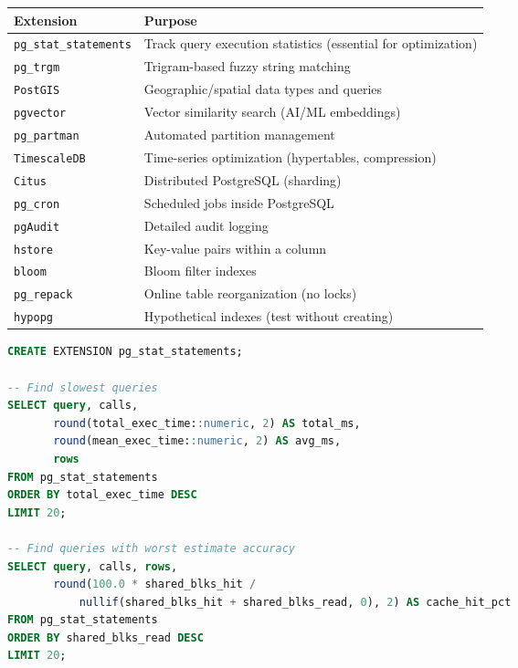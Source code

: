 \documentclass[12pt,a4paper]{article}
\begin{document}
\begin{center}
\begin{tabular}{lp{8cm}}
\toprule
\textbf{Extension} & \textbf{Purpose} \\
\midrule
\texttt{pg\_stat\_statements} & Track query execution statistics (essential for optimization) \\
\texttt{pg\_trgm} & Trigram-based fuzzy string matching \\
\texttt{PostGIS} & Geographic/spatial data types and queries \\
\texttt{pgvector} & Vector similarity search (AI/ML embeddings) \\
\texttt{pg\_partman} & Automated partition management \\
\texttt{TimescaleDB} & Time-series optimization (hypertables, compression) \\
\texttt{Citus} & Distributed PostgreSQL (sharding) \\
\texttt{pg\_cron} & Scheduled jobs inside PostgreSQL \\
\texttt{pgAudit} & Detailed audit logging \\
\texttt{hstore} & Key-value pairs within a column \\
\texttt{bloom} & Bloom filter indexes \\
\texttt{pg\_repack} & Online table reorganization (no locks) \\
\texttt{hypopg} & Hypothetical indexes (test without creating) \\
\bottomrule
\end{tabular}
\end{center}

\begin{lstlisting}[language=SQL, caption={pg\_stat\_statements --- the optimization power tool}]
CREATE EXTENSION pg_stat_statements;

-- Find slowest queries
SELECT query, calls,
       round(total_exec_time::numeric, 2) AS total_ms,
       round(mean_exec_time::numeric, 2) AS avg_ms,
       rows
FROM pg_stat_statements
ORDER BY total_exec_time DESC
LIMIT 20;

-- Find queries with worst estimate accuracy
SELECT query, calls, rows,
       round(100.0 * shared_blks_hit /
           nullif(shared_blks_hit + shared_blks_read, 0), 2) AS cache_hit_pct
FROM pg_stat_statements
ORDER BY shared_blks_read DESC
LIMIT 20;
\end{lstlisting}
\end{document}
